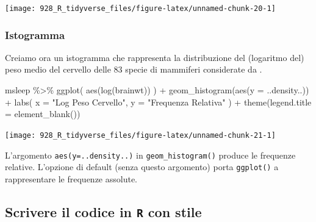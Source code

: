 \documentclass[
]{memoir}
\newenvironment{Shaded}{\begin{snugshade}}{\end{snugshade}}
\newcommand{\AttributeTok}[1]{\textcolor[rgb]{0.77,0.63,0.00}{#1}}
\newcommand{\FunctionTok}[1]{\textcolor[rgb]{0.00,0.00,0.00}{#1}}
\newcommand{\NormalTok}[1]{#1}
\newcommand{\SpecialCharTok}[1]{\textcolor[rgb]{0.00,0.00,0.00}{#1}}
\newcommand{\StringTok}[1]{\textcolor[rgb]{0.31,0.60,0.02}{#1}}
\theoremstyle{definition}
\theoremstyle{definition}
\theoremstyle{definition}
\theoremstyle{definition}
\theoremstyle{remark}
\begin{document}
\begin{center}\texttt{[image: 928\_R\_tidyverse\_files/figure-latex/unnamed-chunk-20-1]} \end{center}

\hypertarget{istogramma}{%
\subsubsection{Istogramma}\label{istogramma}}

Creiamo ora un istogramma che rappresenta la distribuzione del (logaritmo del) peso medio del cervello delle 83 specie di mammiferi considerate da \citet{savage2007quantitative}.

\begin{Shaded}
\begin{Highlighting}[]
\NormalTok{msleep }\SpecialCharTok{\%\textgreater{}\%}
  \FunctionTok{ggplot}\NormalTok{(}
    \FunctionTok{aes}\NormalTok{(}\FunctionTok{log}\NormalTok{(brainwt))}
\NormalTok{  ) }\SpecialCharTok{+}
  \FunctionTok{geom\_histogram}\NormalTok{(}\FunctionTok{aes}\NormalTok{(}\AttributeTok{y =}\NormalTok{ ..density..)) }\SpecialCharTok{+}
  \FunctionTok{labs}\NormalTok{(}
    \AttributeTok{x =} \StringTok{"Log Peso Cervello"}\NormalTok{,}
    \AttributeTok{y =} \StringTok{"Frequenza Relativa"}
\NormalTok{  ) }\SpecialCharTok{+}
  \FunctionTok{theme}\NormalTok{(}\AttributeTok{legend.title =} \FunctionTok{element\_blank}\NormalTok{())}
\end{Highlighting}
\end{Shaded}

\begin{center}\texttt{[image: 928\_R\_tidyverse\_files/figure-latex/unnamed-chunk-21-1]} \end{center}

L'argomento \texttt{aes(y=..density..)} in \texttt{geom\_histogram()} produce le frequenze relative. L'opzione di default (senza questo argomento) porta \texttt{ggplot()} a rappresentare le frequenze assolute.

\hypertarget{scrivere-il-codice-in-r-con-stile}{%
\subsection{\texorpdfstring{Scrivere il codice in \texttt{R} con stile}{Scrivere il codice in R con stile}}\label{scrivere-il-codice-in-r-con-stile}}
\end{document}
